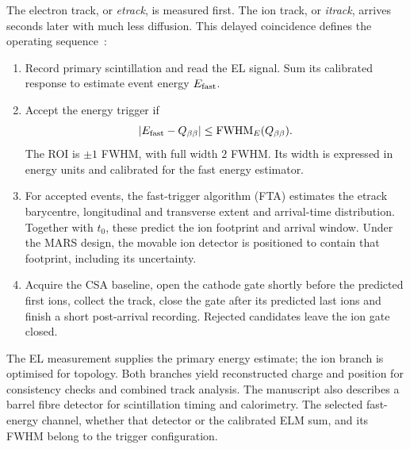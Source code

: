 \documentclass[11pt,a4paper]{article}
\newcommand{\Qbb}{Q_{\beta\beta}}
\begin{document}
The electron track, or \emph{etrack}, is measured first. The ion track, or
\emph{itrack}, arrives seconds later with much less diffusion. This delayed
coincidence defines the operating sequence~\cite{itaca2026}:
\begin{enumerate}
\item Record primary scintillation and read the EL signal. Sum its calibrated
response to estimate event energy $E_{\rm fast}$.
\item Accept the energy trigger if
\begin{equation}
 |E_{\rm fast}-\Qbb|\leq\mathrm{FWHM}_E(\Qbb).
 \label{eq:roi}
\end{equation}
The ROI is $\pm1$ FWHM, with full width $2$ FWHM. Its width is expressed in
energy units and calibrated for the fast energy estimator.
\item For accepted events, the fast-trigger algorithm (FTA) estimates the
etrack barycentre, longitudinal and transverse extent and arrival-time
distribution. Together with $t_0$, these predict the ion footprint and arrival
window. Under the MARS design, the movable ion detector is positioned to
contain that footprint, including its uncertainty.
\item Acquire the CSA baseline, open the cathode gate shortly before the
predicted first ions, collect the track, close the gate after its predicted
last ions and finish a short post-arrival recording. Rejected candidates
leave the ion gate closed.
\end{enumerate}
The EL measurement supplies the primary energy estimate; the ion branch is
optimised for topology. Both branches yield reconstructed charge and position
for consistency checks and combined track analysis. The manuscript also
describes a barrel fibre detector for scintillation timing and calorimetry.
The selected fast-energy channel, whether that detector or the calibrated ELM
sum, and its FWHM belong to the trigger configuration.
\end{document}
